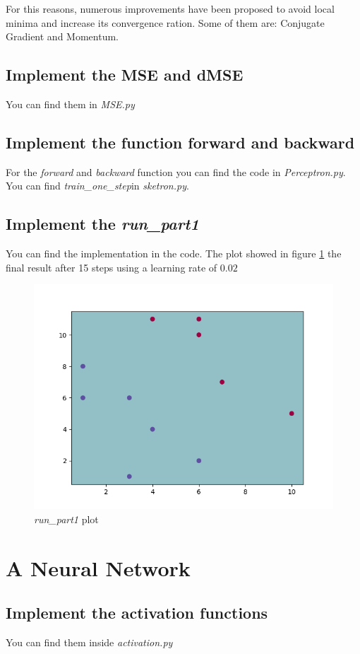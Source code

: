 \documentclass[11pt]{article}
\begin{document}
For this reasons, numerous improvements have been proposed to avoid local minima and increase its convergence ration. Some of them are: Conjugate Gradient and Momentum.
\subsection{Implement the MSE and dMSE}
You can find them in \emph{MSE.py}
\subsection{Implement the function forward and backward}
For the \emph{forward} and \emph{backward} function you can find the code in \emph{Perceptron.py}. You can find \emph{train\_one\_step}in \emph{sketron.py}.

\subsection{Implement the \emph{run\_part1}}
You can find the implementation in the code. The plot showed in figure \ref{fig:runPart1} the final result after 15 steps using a learning rate of $0.02$
\begin{figure}[H]
	\centering
	\includegraphics[scale=0.5]{images/run_part1}
	\caption{\emph{run\_part1} plot}
	\label{fig:runPart1}
\end{figure}

\section{A Neural Network}
\subsection{ Implement the activation functions}
You can find them inside \emph{activation.py}
\end{document}
